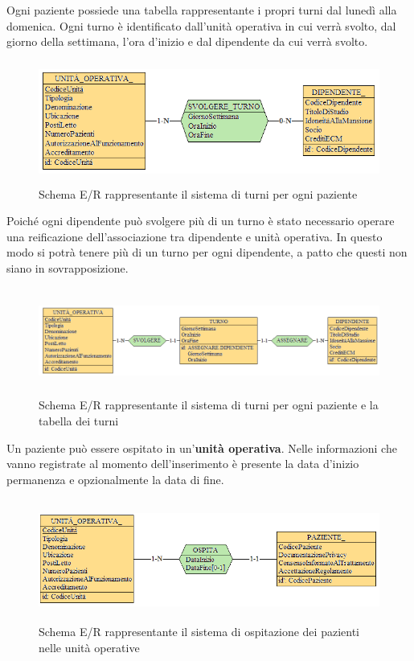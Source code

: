 \documentclass[a4paper, 12pt]{report}
\begin{document}
\noindent
Ogni paziente possiede una tabella rappresentante i propri turni dal lunedì alla domenica. Ogni turno è identificato dall'unità operativa
in cui verrà svolto, dal giorno della settimana, l'ora d'inizio e dal dipendente da cui verrà svolto.
\begin{figure}[H]
        \centering
        \includegraphics[height=4cm]{img/dipendenteTurniPreReif.png}
        \caption{Schema E/R rappresentante il sistema di turni per ogni paziente}
\end{figure}

\noindent
Poiché ogni dipendente può svolgere più di un turno è stato necessario operare una reificazione dell'associazione tra dipendente
e unità operativa. In questo modo si potrà tenere più di un turno per ogni dipendente, a patto che questi non siano in sovrapposizione.

\begin{figure}[H]
        \centering
        \includegraphics[height=3.5cm]{img/dipendenteTurniPostReif.png}
        \caption{Schema E/R rappresentante il sistema di turni per ogni paziente e la tabella dei turni}
\end{figure}

\noindent
Un paziente può essere ospitato in un'\textbf{unità operativa}. Nelle informazioni che vanno registrate al momento dell'inserimento è presente
la data d'inizio permanenza e opzionalmente la data di fine.

\begin{figure}[H]
        \centering
        \includegraphics[height=4cm]{img/pazienteOspitazionePreReif.png}
        \caption{Schema E/R rappresentante il sistema di ospitazione dei pazienti nelle unità operative}
\end{figure}
\end{document}

